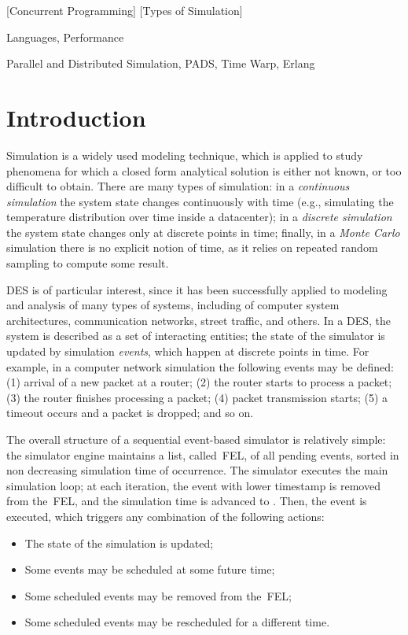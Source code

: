 \documentclass{sigplanconf}
\begin{document}
[Concurrent Programming]
[Types of Simulation]

\terms
Languages, Performance

\keywords
Parallel and Distributed Simulation, PADS, Time Warp, Erlang

\section{Introduction}

Simulation is a widely used modeling technique, which is applied to
study phenomena for which a closed form analytical solution is either
not known, or too difficult to obtain. There are many types of
simulation: in a \emph{continuous simulation} the system state changes
continuously with time (e.g., simulating the temperature distribution
over time inside a datacenter); in a \emph{discrete simulation} the
system state changes only at discrete points in time; finally, in a
\emph{Monte Carlo} simulation there is no explicit notion of time, as
it relies on repeated random sampling to compute some result.

\ac{DES} is of particular interest, since it has been successfully
applied to modeling and analysis of many types of systems, including
of computer system architectures, communication networks, street
traffic, and others. In a \acl{DES}, the system is described as a set
of interacting entities; the state of the simulator is updated by
simulation \emph{events}, which happen at discrete points in time.
For example, in a computer network simulation the following events may
be defined: (1) arrival of a new packet at a router; (2) the router
starts to process a packet; (3) the router finishes processing a
packet; (4) packet transmission starts; (5) a timeout occurs and a
packet is dropped; and so on.

The overall structure of a sequential event-based simulator is
relatively simple: the simulator engine maintains a list,
called~\ac{FEL}, of all pending events, sorted in non decreasing
simulation time of occurrence. The simulator executes the main
simulation loop; at each iteration, the event with lower timestamp 
is removed from the~\ac{FEL}, and the simulation time is advanced to
. Then, the event is executed, which triggers any combination of
the following actions:

\begin{itemize}
\item The state of the simulation is updated;
\item Some events may be scheduled at some future time;
\item Some scheduled events may be removed from the~\ac{FEL};
\item Some scheduled events may be rescheduled for a different
  time.
\end{itemize}
\end{document}
